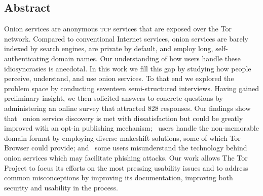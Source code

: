 \subsection*{Abstract}
Onion services are anonymous \textsc{tcp} services that are exposed over the Tor
network.  Compared to conventional Internet services, onion services are barely
indexed by search engines, are private by default, and employ long,
self-authenticating domain names.  Our understanding of how users handle these
idiosyncrasies is anecdotal.
In this work we fill this gap by studying how people perceive, understand, and
use onion services.  To that end we explored the problem space by conducting
seventeen semi-structured interviews.  Having gained preliminary insight, we
then solicited answers to concrete questions by administering an online survey
that attracted 828 responses.  Our findings show that \first~onion service
discovery is met with dissatisfaction but could be greatly improved with an
opt-in publishing mechanism; \second~users handle the non-memorable domain
format by employing diverse makeshift solutions, some of which Tor Browser could
provide; and \third~some users misunderstand the technology behind onion
services which may facilitate phishing attacks.
Our work allows The Tor Project to focus its efforts on the most pressing
usability issues and to address common misconceptions by improving its
documentation, improving both security and usability in the process.
